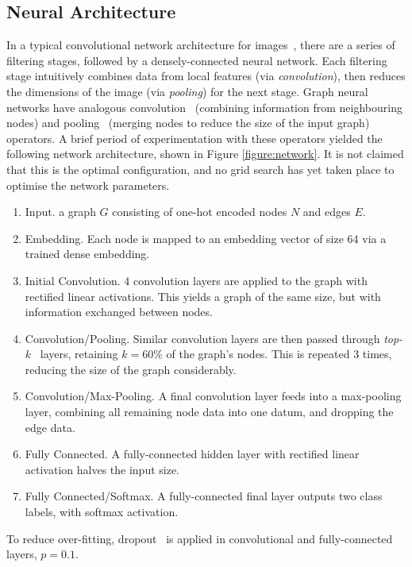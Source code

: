 \documentclass[runningheads]{llncs}
\begin{document}
\subsection{Neural Architecture}
In a typical convolutional network architecture for images~\cite{cnn}, there are a series of filtering stages, followed by a densely-connected neural network.
Each filtering stage intuitively combines data from local features (via \emph{convolution}), then reduces the dimensions of the image (via \emph{pooling}) for the next stage.
Graph neural networks have analogous convolution~\cite{gcn} (combining information from neighbouring nodes) and pooling~\cite{top-k-pooling} (merging nodes to reduce the size of the input graph) operators.
A brief period of experimentation with these operators yielded the following network architecture, shown in Figure \ref{figure:network}.
It is not claimed that this is the optimal configuration, and no grid search has yet taken place to optimise the network parameters.
\begin{enumerate}
	\item Input. a graph \(G\) consisting of one-hot encoded nodes \(N\) and edges \(E\).
	\item Embedding. Each node is mapped to an embedding vector of size 64 via a trained dense embedding.
	\item Initial Convolution. 4 convolution layers are applied to the graph with rectified linear activations. This yields a graph of the same size, but with information exchanged between nodes.
	\item Convolution/Pooling. Similar convolution layers are then passed through \emph{top-\(k\)}~\cite{top-k-pooling} layers, retaining \(k = 60\%\) of the graph's nodes. This is repeated 3 times, reducing the size of the graph considerably.
	\item Convolution/Max-Pooling. A final convolution layer feeds into a max-pooling layer, combining all remaining node data into one datum, and dropping the edge data.
	\item Fully Connected. A fully-connected hidden layer with rectified linear activation halves the input size.
	\item Fully Connected/Softmax. A fully-connected final layer outputs two class labels, with softmax activation.
\end{enumerate}

To reduce over-fitting, dropout~\cite{dropout} is applied in convolutional and fully-connected layers, \(p = 0.1\).
\end{document}
